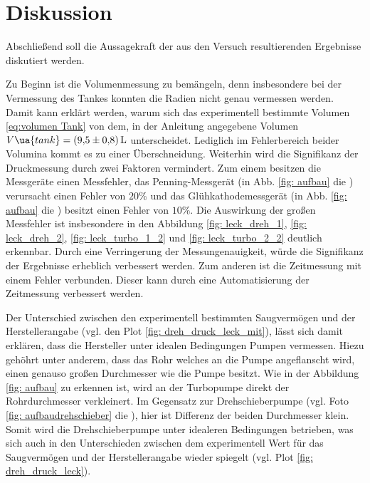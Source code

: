 \section{Diskussion}

Abschließend soll die Aussagekraft der aus den Versuch resultierenden Ergebnisse diskutiert werden. %

Zu Beginn ist die Volumenmessung zu bemängeln, denn insbesondere bei der Vermessung des Tankes
konnten die Radien nicht genau vermessen werden. Damit kann erklärt werden, warum sich das experimentell
bestimmte Volumen \eqref{eq:volumen Tank} von dem, in der Anleitung \cite{} angegebene Volumen %
$V\ua{tank}=\SI{9.5\pm0,8}{\litre}$ unterscheidet. Lediglich im Fehlerbereich beider Volumina
kommt es zu einer Überschneidung.
Weiterhin wird die Signifikanz der Druckmessung durch zwei Faktoren vermindert.
Zum einem besitzen die Messgeräte einen Messfehler, das Penning-Messgerät (in Abb. \ref{fig: aufbau} die ) verursacht einen Fehler von $20\%$ und das %
Glühkathodemessgerät (in Abb. \ref{fig: aufbau} die ) besitzt einen Fehler von $10\%$. Die Auswirkung der großen Messfehler %
ist insbesondere in den Abbildung \ref{fig: leck_dreh_1}, \ref{fig: leck_dreh_2}, \ref{fig: leck_turbo_1_2} und \ref{fig: leck_turbo_2_2} deutlich erkennbar. %
Durch eine Verringerung der Messungenauigkeit, würde die Signifikanz der Ergebnisse erheblich verbessert werden.
Zum anderen ist die Zeitmessung mit einem Fehler verbunden. Dieser kann durch eine Automatisierung der Zeitmessung verbessert werden.

Der Unterschied zwischen den experimentell bestimmten Saugvermögen und der Herstellerangabe (vgl. den Plot \ref{fig: dreh_druck_leck_mit}),
lässt sich damit erklären, dass die Hersteller unter idealen Bedingungen Pumpen vermessen. Hiezu gehöhrt unter anderem, dass das Rohr welches an die Pumpe angeflanscht wird,
einen genauso großen Durchmesser wie die Pumpe besitzt. Wie in der Abbildung \ref{fig: aufbau} zu erkennen ist, wird an der Turbopumpe  direkt der
Rohrdurchmesser verkleinert. Im Gegensatz zur Drehschieberpumpe (vgl. Foto \ref{fig: aufbaudrehschieber} die ),
hier ist Differenz der beiden Durchmesser klein. Somit wird die Drehschieberpumpe unter idealeren Bedingungen betrieben, was sich auch in den %
Unterschieden zwischen dem experimentell Wert für das Saugvermögen und der Herstellerangabe wieder spiegelt (vgl. Plot \ref{fig: dreh_druck_leck}). %

